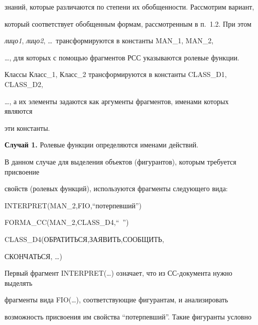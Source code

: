 знаний, которые различаются по степени их обобщенности. Рассмотрим вариант, 


который соответствует обобщенным формам, рассмотренным в п.~1.2. При этом 


\textit{лицо1}, \textit{лицо2}, \ldots\ трансформируются в константы MAN\_1, MAN\_2, 


\ldots , для которых с помощью фрагментов РСС указываются ролевые функции. 


Классы Класс\_1, Класс\_2 трансформируются в константы CLASS\_D1, CLASS\_D2, 


\ldots , а их элементы задаются как аргументы фрагментов, именами которых являются 


эти константы.   


    


\medskip





\noindent


\textbf{Случай 1.} Ролевые функции определяются именами действий. 





В данном случае для выделения объектов (фигурантов), которым требуется присвоение 


свойств (ролевых функций), используются фрагменты следующего вида:  





{\sf  INTERPRET(MAN\_2,FIO,``потерпевший'')





  FORMA\_CC(MAN\_2,CLASS\_D4,``~'')





  CLASS\_D4(ОБРАТИТЬСЯ,ЗАЯВИТЬ,СООБЩИТЬ, 


  




СКОНЧАТЬСЯ, \ldots) }


  


 Первый фрагмент {\sf INTERPRET(\ldots)} означает, что из СС-документа нужно выделять 


фрагменты вида {\sf FIO(\ldots)}, соответствующие фигурантам, и анализировать 


возможность присвоения им свойства ``потерпевший''. Такие фигуранты условно 


